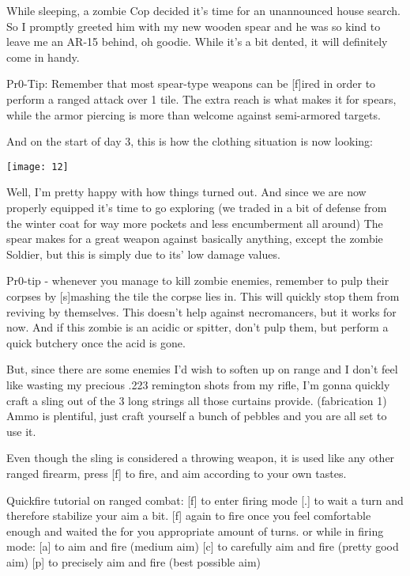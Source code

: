 While sleeping, a zombie Cop decided it's time for an unannounced house search. So I promptly greeted him with my new wooden spear and he was so kind to leave me an AR-15 behind, oh goodie. While it's a bit dented, it will definitely come in handy.

Pr0-Tip: Remember that most spear-type weapons can be [f]ired in order to perform a ranged attack over 1 tile. The extra reach is what makes it for spears, while the armor piercing is more than welcome against semi-armored targets.

And on the start of day 3, this is how the clothing situation is now looking:

\begin{center}
\texttt{[image: 12]}
\end{center}

Well, I'm pretty happy with how things turned out. And since we are now properly equipped it's time to go exploring (we traded in a bit of defense from the winter coat for way more pockets and less encumberment all around) The spear makes for a great weapon against basically anything, except the zombie Soldier, but this is simply due to its' low damage values.

Pr0-tip - whenever you manage to kill zombie enemies, remember to pulp their corpses by [s]mashing the tile the corpse lies in. This will quickly stop them from reviving by themselves. This doesn't help against necromancers, but it works for now. And if this zombie is an acidic or spitter, don't pulp them, but perform a quick butchery once the acid is gone.

But, since there are some enemies I'd wish to soften up on range and I don't feel like wasting my precious .223 remington shots from my rifle, I'm gonna quickly craft a sling out of the 3 long strings all those curtains provide. (fabrication 1) Ammo is plentiful, just craft yourself a bunch of pebbles and you are all set to use it.

Even though the sling is considered a throwing weapon, it is used like any other ranged firearm, press [f] to fire, and aim according to your own tastes.

Quickfire tutorial on ranged combat:
[f] to enter firing mode
[.] to wait a turn and therefore stabilize your aim a bit.
[f] again to fire once you feel comfortable enough and waited the for you appropriate amount of turns.
or
while in firing mode:
[a] to aim and fire (medium aim)
[c] to carefully aim and fire (pretty good aim)
[p] to precisely aim and fire (best possible aim)

